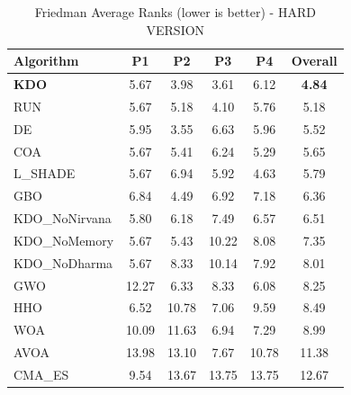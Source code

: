 \begin{table}[htbp]
\centering
\caption{Friedman Average Ranks (lower is better) - HARD VERSION}
\label{tab:friedman_ranks}
\small
\begin{tabular}{lccccc}
\toprule
\textbf{Algorithm} & \textbf{P1} & \textbf{P2} & \textbf{P3} & \textbf{P4} & \textbf{Overall} \\
\midrule
\textbf{KDO} & 5.67 & 3.98 & 3.61 & 6.12 & \textbf{4.84} \\
RUN & 5.67 & 5.18 & 4.10 & 5.76 & 5.18 \\
DE & 5.95 & 3.55 & 6.63 & 5.96 & 5.52 \\
COA & 5.67 & 5.41 & 6.24 & 5.29 & 5.65 \\
L_SHADE & 5.67 & 6.94 & 5.92 & 4.63 & 5.79 \\
GBO & 6.84 & 4.49 & 6.92 & 7.18 & 6.36 \\
KDO_NoNirvana & 5.80 & 6.18 & 7.49 & 6.57 & 6.51 \\
KDO_NoMemory & 5.67 & 5.43 & 10.22 & 8.08 & 7.35 \\
KDO_NoDharma & 5.67 & 8.33 & 10.14 & 7.92 & 8.01 \\
GWO & 12.27 & 6.33 & 8.33 & 6.08 & 8.25 \\
HHO & 6.52 & 10.78 & 7.06 & 9.59 & 8.49 \\
WOA & 10.09 & 11.63 & 6.94 & 7.29 & 8.99 \\
AVOA & 13.98 & 13.10 & 7.67 & 10.78 & 11.38 \\
CMA_ES & 9.54 & 13.67 & 13.75 & 13.75 & 12.67 \\
\bottomrule
\end{tabular}
\end{table}
